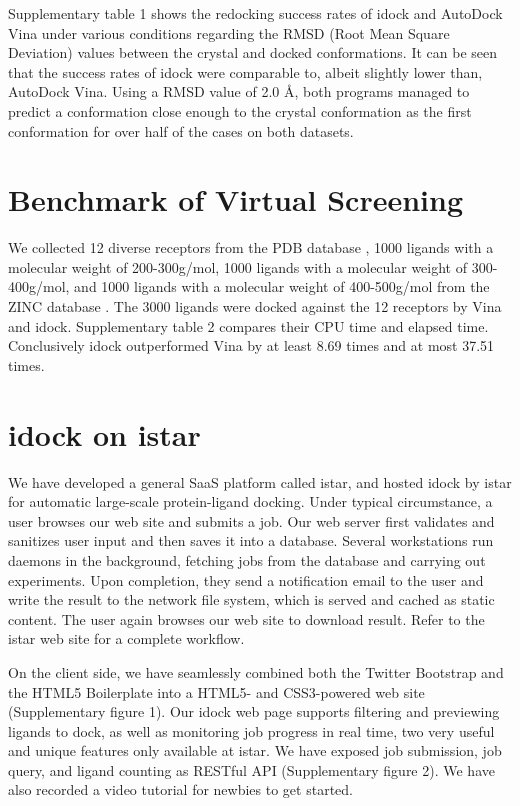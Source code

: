 \documentclass{bioinfo}
\begin{document}
Supplementary table 1 shows the redocking success rates of idock and AutoDock Vina under various conditions regarding the RMSD (Root Mean Square Deviation) values between the crystal and docked conformations. It can be seen that the success rates of idock were comparable to, albeit slightly lower than, AutoDock Vina. Using a RMSD value of 2.0 \AA, both programs managed to predict a conformation close enough to the crystal conformation as the first conformation for over half of the cases on both datasets.

\section{Benchmark of Virtual Screening}

We collected 12 diverse receptors from the PDB database \citep{540}, 1000 ligands with a molecular weight of 200-300g/mol, 1000 ligands with a molecular weight of 300-400g/mol, and 1000 ligands with a molecular weight of 400-500g/mol from the ZINC database \citep{1178}. The 3000 ligands were docked against the 12 receptors by Vina and idock. Supplementary table 2 compares their CPU time and elapsed time. Conclusively idock outperformed Vina by at least 8.69 times and at most 37.51 times.

\section{idock on istar}

We have developed a general SaaS platform called istar, and hosted idock by istar for automatic large-scale protein-ligand docking. Under typical circumstance, a user browses our web site and submits a job. Our web server first validates and sanitizes user input and then saves it into a database. Several workstations run daemons in the background, fetching jobs from the database and carrying out experiments. Upon completion, they send a notification email to the user and write the result to the network file system, which is served and cached as static content. The user again browses our web site to download result. Refer to the istar web site for a complete workflow.

On the client side, we have seamlessly combined both the Twitter Bootstrap and the HTML5 Boilerplate into a HTML5- and CSS3-powered web site (Supplementary figure 1). Our idock web page supports filtering and previewing ligands to dock, as well as monitoring job progress in real time, two very useful and unique features only available at istar. We have exposed job submission, job query, and ligand counting as RESTful API (Supplementary figure 2). We have also recorded a video tutorial for newbies to get started.
\end{document}
